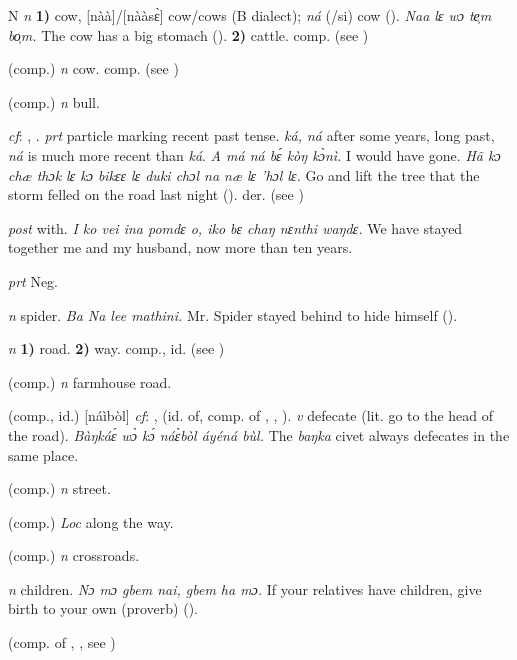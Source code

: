 \begin{letter}{N}
 \textit{n} \textbf{1)} cow, [nàà]/[nààsɛ̀] cow/cows (B dialect); \textit{ná} (/si) cow (\citealt{Sumner1921}). \textit{Naa lɛ wɔ te̹m bo̹m.} The cow has a big stomach (\citealt{Pichl1967}). \textbf{2)} cattle. comp.  (see )

 (comp.) \textit{n} cow. comp.  (see )

 (comp.) \textit{n} bull.

 \textit{cf}: , . \textit{prt} particle marking recent past tense. \textit{ká, ná} after some years, long past, \textit{ná} is much more recent than \textit{ká}. \textit{A má ná bɛ́ kòŋ kɔ̀nì.} I would have gone. \textit{Hã kɔ chæ thɔk lɛ kɔ bikɛɛ lɛ duki chɔl na næ lɛ 'hɔl lɛ.} Go and lift the tree that the storm felled on the road last night (\citealt{Pichl1967}). der.  (see ) 

 \textit{post} with. \textit{I ko vei ina pomdɛ o, iko bɛ chaŋ nɛnthi waŋdɛ.} We have stayed together me and my husband, now more than ten years.

 \textit{prt} Neg.

 \textit{n} spider. \textit{Ba Na lee mathini.} Mr. Spider stayed behind to hide himself (\citealt{Pichl1967}).

 \textit{n} \textbf{1)} road. \textbf{2)} way. comp., id.  (see )

 (comp.) \textit{n} farmhouse road.

 (comp., id.) [náìbòl] \textit{cf}: ,  (id. of, comp. of , , ). \textit{v} defecate (lit. go to the head of the road). \textit{Bàŋkáɛ́ wɔ̀ kɔ́ náɛ̀bòl áyéná bùl.} The \textit{baŋka} civet always defecates in the same place.

 (comp.) \textit{n} street.

 (comp.) \textit{Loc} along the way.

 (comp.) \textit{n} crossroads.

 \textit{n} children. \textit{Nɔ mɔ gbem nai, gbem ha mɔ.} If your relatives have children, give birth to your own (proverb) (\citealt{TISLL1979}).

 (comp. of , , see ) 


\end{letter}
